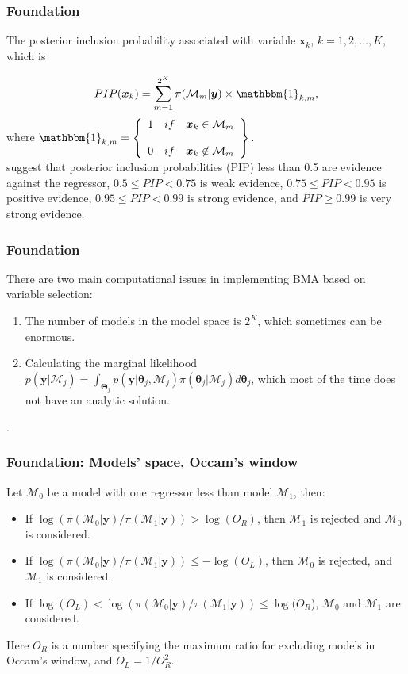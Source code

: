\documentclass[12pt, compress]{beamer}
\begin{document}
\begin{frame}
	\frametitle{Foundation}
The posterior inclusion probability associated with variable $\bm{x}_k$, $k=1,2,\dots,K$, which is

\begin{equation*}
	PIP(\bm{x}_k)=\sum_{m=1}^{2^K}\pi(\mathcal{M}_m|\bm{y})\times \mathbbm{1}_{k,m},
\end{equation*}
where
$\mathbbm{1}_{k,m}= \left\{ \begin{array}{lcc}
	1&   if  & \bm{x}_{k}\in \mathcal{M}_m \\
	\\ 0 &  if & \bm{x}_{k}\not \in \mathcal{M}_m
\end{array}
\right\}.$\\

\cite{Kass1995} suggest that posterior inclusion probabilities (PIP) less than 0.5 are evidence against the regressor, $0.5\leq PIP<0.75$ is weak evidence, $0.75\leq PIP<0.95$ is positive evidence, $0.95\leq PIP<0.99$ is strong evidence, and $PIP\geq 0.99$ is very strong evidence.
\end{frame}

\begin{frame}
	\frametitle{Foundation}
There are two main computational issues in implementing BMA based on variable selection:

\begin{enumerate}
    \item The number of models in the model space is $2^K$, which sometimes can be enormous.
    \item Calculating the marginal likelihood $p(\bm{y} | \mathcal{M}_j)=\int_{\bm{\Theta}_j} p(\bm{y}| \bm{\theta}_j,\mathcal{M}_j)\pi(\bm{\theta}_j | \mathcal{M}_j) d\bm{\theta}_{j}$, which most of the time does not have an analytic solution. 
\end{enumerate}. 
\end{frame}
\begin{frame}
	\frametitle{Foundation: Models' space, Occam's window}
Let $\mathcal{M}_0$ be a model with one regressor less than model $\mathcal{M}_1$, then:
\begin{itemize}
	\item If $\log(\pi(\mathcal{M}_0|\bm{y})/\pi(\mathcal{M}_1|\bm{y}))>\log(O_R)$, then $\mathcal{M}_1$ is rejected and $\mathcal{M}_0$ is considered.
	\item If $\log(\pi(\mathcal{M}_0|\bm{y})/\pi(\mathcal{M}_1|\bm{y}))\leq -\log(O_L)$, then $\mathcal{M}_0$ is rejected, and $\mathcal{M}_1$ is considered.
	 \item If $\log(O_L)<\log(\pi(\mathcal{M}_0|\bm{y})/\pi(\mathcal{M}_1|\bm{y}))\leq \log(O_R$), $\mathcal{M}_0$ and $\mathcal{M}_1$ are considered.
\end{itemize} 
Here $O_R$ is a number specifying the maximum ratio for excluding models in Occam's window, and $O_L=1/O_R^{2}$. 
\end{frame}
\end{document}
